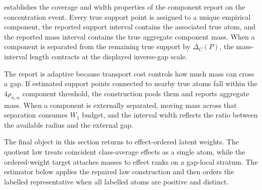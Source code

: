 \documentclass[11pt]{article}
\begin{document}
 establishes the coverage and width properties of the component report on the concentration event. Every true support point is assigned to a unique empirical component, the reported support interval contains the associated true atom, and the reported mass interval contains the true aggregate component mass. When a component is separated from the remaining true support by \(\Delta_C(P)\), the mass-interval length contracts at the displayed inverse-gap scale.

The report is adaptive because transport cost controls how much mass can cross a gap. If estimated support points connected to nearby true atoms fall within the \(4\rho_{n,\alpha}\) component threshold, the construction pools them and reports aggregate mass. When a component is externally separated, moving mass across that separation consumes \(W_1\) budget, and the interval width reflects the ratio between the available radius and the external gap.

The final object in this section returns to effect-ordered latent weights. The quotient law treats coincident class-average effects as a single atom, while the ordered-weight target attaches masses to effect ranks on a gap-local stratum. The estimator below applies the repaired law construction and then orders the labelled representative when all labelled atoms are positive and distinct.
\end{document}

